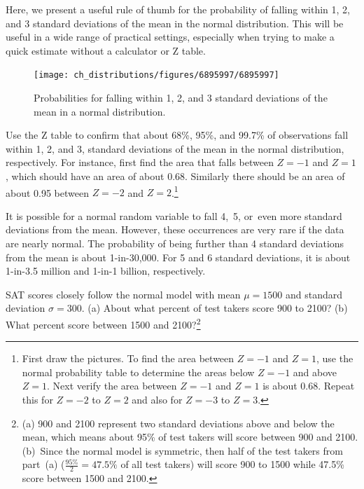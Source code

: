 Here, we present a useful rule of thumb for the probability of falling within 1, 2, and 3 standard deviations of the mean in the normal distribution. This will be useful in a wide range of practical settings, especially when trying to make a quick estimate without a calculator or Z table.

\begin{figure}[hht]
\centering
\texttt{[image: ch\_distributions/figures/6895997/6895997]}
\caption{Probabilities for falling within 1, 2, and 3 standard deviations of the mean in a normal distribution.}
\label{6895997}
\end{figure}

\begin{exercise}
Use the Z table to confirm that about 68\%, 95\%, and 99.7\% of observations fall within 1, 2, and 3, standard deviations of the mean in the normal distribution, respectively. For instance, first find the area that falls between $Z=-1$ and $Z=1$, which should have an area of about 0.68. Similarly there should be an area of about 0.95 between $Z=-2$ and $Z=2$.\footnote{First draw the pictures. To find the area between $Z=-1$ and $Z=1$, use the normal probability table to determine the areas below $Z=-1$ and above $Z=1$. Next verify the area between $Z=-1$ and $Z=1$ is about 0.68. Repeat this for $Z=-2$ to $Z=2$ and also for $Z=-3$ to $Z=3$.}
\end{exercise}

It is possible for a normal random variable to fall 4,~5, or~even more standard deviations from the mean. However, these occurrences are very rare if the data are nearly normal. The probability of being further than 4 standard deviations from the mean is about 1-in-30,000. For 5 and 6 standard deviations, it is about 1-in-3.5 million and 1-in-1 billion, respectively.

\begin{exercise}
SAT scores closely follow the normal model with mean $\mu = 1500$ and standard deviation $\sigma = 300$. (a) About what percent of test takers score 900 to 2100? (b) What percent score between 1500 and 2100?\footnote{(a) 900 and 2100 represent two standard deviations above and below the mean, which means about 95\% of test takers will score between 900 and 2100. (b)~Since the normal model is symmetric, then half of the test takers from part~(a) ($\frac{95\%}{2} = 47.5\%$ of all test takers) will score 900 to 1500 while 47.5\% score between 1500 and 2100.}
\end{exercise}


